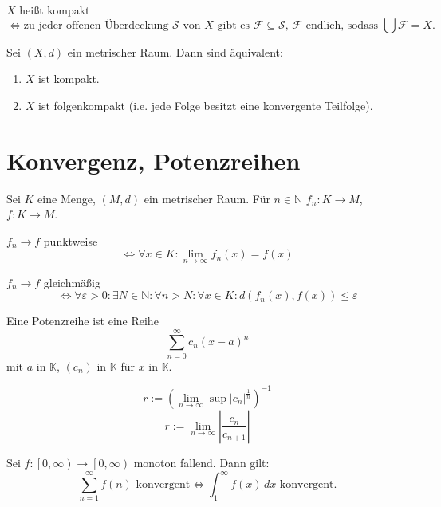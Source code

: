\documentclass[]{scrartcl}
\newcommand{\N}{\ensuremath{\mathbb{N}}}
\begin{document}
\begin{definition}[Kompaktheit]
$X$ hei\ss t kompakt
\[\Leftrightarrow\text{zu jeder offenen \"Uberdeckung $\mathcal{S}$ von $X$ gibt es $\mathcal{F}\subseteq\mathcal{S}$, $\mathcal{F}$ endlich, sodass $\bigcup\mathcal{F}=X$.}\]
\end{definition}

\begin{satz}
Sei $(X,d)$ ein metrischer Raum. Dann sind \"aquivalent:
\begin{enumerate}
\item $X$ ist kompakt.
\item $X$ ist folgenkompakt (i.e. jede Folge besitzt eine konvergente Teilfolge). 
\end{enumerate}
\end{satz}

\section*{Konvergenz, Potenzreihen}
\begin{definition}[konvergenz]
Sei $K$ eine Menge, $(M,d)$ ein metrischer Raum. F\"ur $n\in\N$ $f_n\colon K\to M$, $f\colon K\to M$.

$f_n\to f$ punktweise
\[\Leftrightarrow \forall x\in K \colon  \lim\limits_{n\to\infty}f_n(x)=f(x)\]

$f_n\to f$ gleichm\"a\ss ig
\[\Leftrightarrow \forall \varepsilon>0 \colon  \exists N\in\N\colon \forall n>N \colon  \forall x\in K\colon  d(f_n(x),f(x))\leq\varepsilon\]
\end{definition}

\begin{definition}[Potenzreihe]
Eine Potenzreihe ist eine Reihe
\[\sum\limits^\infty_{n=0}c_n(x-a)^n\]
mit $a$ in $\mathbb{K}$, $(c_n)$ in $\mathbb{K}$ f\"ur $x$ in $\mathbb{K}$.
\end{definition}

\begin{satz}[Konvergenzradius]
\[r:=(\lim_{n\to\infty}\sup{|c_n|^{\frac{1}{n}}})^{-1}\]
\[r:=\lim_{n\to\infty}\left|\frac{c_n}{c_{n+1}}\right|\]
\end{satz}

\begin{satz}[Integralvergleichskriterium]
Sei $f\colon \left[0,\infty\right)\to \left[0,\infty\right)$ monoton fallend. Dann gilt:
\[\sum\limits^\infty_{n=1}f(n) \text{ konvergent}\Leftrightarrow \int_{1}^{\infty}f(x)\, dx\text{ konvergent.}\]
\end{satz}
\end{document}
